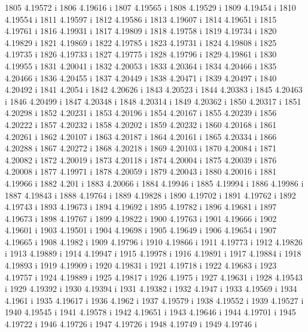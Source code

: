  1805  4.19572  i
 1806  4.19616  i
 1807  4.19565  i
 1808  4.19529  i
 1809  4.19454  i
 1810  4.19554  i
 1811  4.19597  i
 1812  4.19586  i
 1813  4.19607  i
 1814  4.19651  i
 1815  4.19761  i
 1816  4.19931  i
 1817  4.19809  i
 1818  4.19758  i
 1819  4.19734  i
 1820  4.19829  i
 1821  4.19869  i
 1822  4.19785  i
 1823  4.19731  i
 1824  4.19808  i
 1825  4.19735  i
 1826  4.19733  i
 1827  4.19775  i
 1828  4.19796  i
 1829  4.19861  i
 1830  4.19955  i
 1831  4.20041  i
 1832  4.20053  i
 1833  4.20364  i
 1834  4.20466  i
 1835  4.20466  i
 1836  4.20455  i
 1837  4.20449  i
 1838  4.20471  i
 1839  4.20497  i
 1840  4.20492  i
 1841  4.2054  i
 1842  4.20626  i
 1843  4.20523  i
 1844  4.20383  i
 1845  4.20463  i
 1846  4.20499  i
 1847  4.20348  i
 1848  4.20314  i
 1849  4.20362  i
 1850  4.20317  i
 1851  4.20298  i
 1852  4.20231  i
 1853  4.20196  i
 1854  4.20167  i
 1855  4.20239  i
 1856  4.20222  i
 1857  4.20232  i
 1858  4.20202  i
 1859  4.20232  i
 1860  4.20168  i
 1861  4.20261  i
 1862  4.20107  i
 1863  4.20187  i
 1864  4.20161  i
 1865  4.20334  i
 1866  4.20288  i
 1867  4.20272  i
 1868  4.20218  i
 1869  4.20103  i
 1870  4.20084  i
 1871  4.20082  i
 1872  4.20019  i
 1873  4.20118  i
 1874  4.20004  i
 1875  4.20039  i
 1876  4.20008  i
 1877  4.19971  i
 1878  4.20059  i
 1879  4.20043  i
 1880  4.20016  i
 1881  4.19966  i
 1882  4.201  i
 1883  4.20066  i
 1884  4.19946  i
 1885  4.19994  i
 1886  4.19986  i
 1887  4.19843  i
 1888  4.19764  i
 1889  4.19828  i
 1890  4.19702  i
 1891  4.19762  i
 1892  4.19743  i
 1893  4.19673  i
 1894  4.19692  i
 1895  4.19782  i
 1896  4.19681  i
 1897  4.19673  i
 1898  4.19767  i
 1899  4.19822  i
 1900  4.19763  i
 1901  4.19666  i
 1902  4.19601  i
 1903  4.19501  i
 1904  4.19698  i
 1905  4.19649  i
 1906  4.19654  i
 1907  4.19665  i
 1908  4.1982  i
 1909  4.19796  i
 1910  4.19866  i
 1911  4.19773  i
 1912  4.19826  i
 1913  4.19889  i
 1914  4.19947  i
 1915  4.19978  i
 1916  4.19891  i
 1917  4.19884  i
 1918  4.19893  i
 1919  4.19909  i
 1920  4.19831  i
 1921  4.19718  i
 1922  4.19683  i
 1923  4.19757  i
 1924  4.19889  i
 1925  4.19817  i
 1926  4.1975  i
 1927  4.19631  i
 1928  4.19543  i
 1929  4.19392  i
 1930  4.19394  i
 1931  4.19382  i
 1932  4.1947  i
 1933  4.19569  i
 1934  4.1961  i
 1935  4.19617  i
 1936  4.1962  i
 1937  4.19579  i
 1938  4.19552  i
 1939  4.19527  i
 1940  4.19545  i
 1941  4.19578  i
 1942  4.19651  i
 1943  4.19646  i
 1944  4.19701  i
 1945  4.19722  i
 1946  4.19726  i
 1947  4.19726  i
 1948  4.19749  i
 1949  4.19746  i
